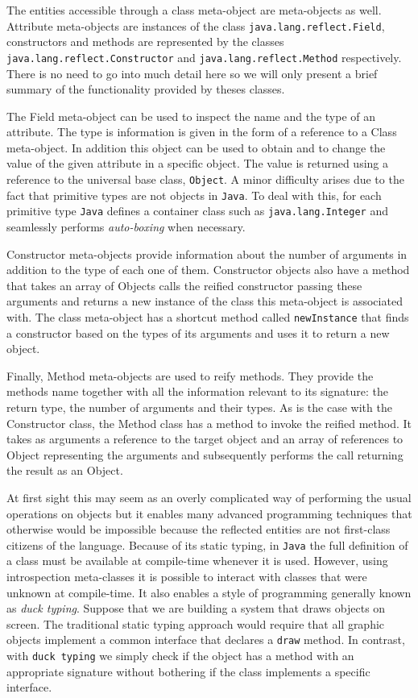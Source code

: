 The entities accessible through a class meta-object are meta-objects as well. Attribute meta-objects are instances of the class
\texttt{java.lang.reflect.Field}, constructors and methods are represented by the classes \texttt{java.lang.reflect.Constructor} and \texttt{java.lang.reflect.Method}
respectively. There is no need to go into much detail here so we will only present a brief summary of the functionality provided
by theses classes.

The Field meta-object can be used to inspect the name and the type of an attribute. The type is information is given in the form of
a reference to a Class meta-object. In addition this object can be used to obtain and to change the value of the given attribute in
a specific object. The value is returned using a reference to the universal base class, \texttt{Object}. A minor difficulty arises due to the
fact that primitive types are not objects in \texttt{Java}. To deal with this, for each primitive type \texttt{Java} defines a container class such
as \texttt{java.lang.Integer} and seamlessly performs \emph{auto-boxing} when necessary.

Constructor meta-objects provide information about the number of arguments in addition to the type of each one of them. Constructor
objects also have a method that takes an array of Objects calls the reified constructor passing these arguments and returns a new
instance of the class this meta-object is associated with. The class meta-object has a shortcut method called \texttt{newInstance}
that finds a constructor based on the types of its arguments and uses it to return a new object.

Finally, Method meta-objects are used to reify methods. They provide the methods name together with all the information relevant to
its signature: the return type, the number of arguments and their types. As is the case with the Constructor class, the Method
class has a method to invoke the reified method. It takes as arguments a reference to the target object and an array of references
to Object representing the arguments and subsequently performs the call returning the result as an Object.

At first sight this may seem as an overly complicated way of performing the usual operations on objects but it enables many
advanced programming techniques that otherwise would be impossible because the reflected entities are not first-class citizens
of the language. Because of its static typing, in \texttt{Java} the full definition of a class must be available at
compile-time whenever it is used. However, using introspection meta-classes it is possible to interact with classes that
were unknown at compile-time. It also enables a style of programming generally known as \emph{duck typing}. Suppose that
we are building a system that draws objects on screen. The traditional static typing approach
would require that all graphic objects implement a common interface that declares a \texttt{draw} method. In contrast, with
\texttt{duck typing} we simply check if the object has a method with an appropriate signature without bothering if the class
implements a specific interface.

